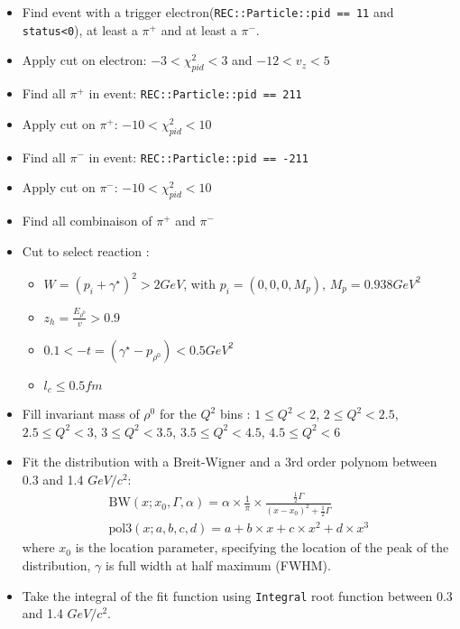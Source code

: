 \documentclass{report}
\begin{document}
    \begin{itemize}
        \item Find event with a trigger electron(\texttt{REC::Particle::pid == 11} and \texttt{status<0}), at least a \(\pi^+\) and at least a \(\pi^-\).
        \item Apply cut on electron: \(-3 < \chi^2_{pid} < 3\) and \(-12 < v_z < 5\)
        \item Find all \(\pi^+\) in event: \texttt{REC::Particle::pid == 211}
        \item Apply cut on \(\pi^+\): \(-10 < \chi^2_{pid} < 10\) 
        \item Find all \(\pi^-\) in event: \texttt{REC::Particle::pid == -211}
        \item Apply cut on \(\pi^-\): \(-10 < \chi^2_{pid} < 10\)
        \item Find all combinaison of \(\pi^+\) and \(\pi^-\)
        \item Cut to select reaction : 
        \begin{itemize}
            \item \(W = (p_i + \gamma^{\star})^2 > 2GeV\), with \(p_i = (0,0,0,M_p)\), \(M_p = 0.938 GeV^2\)
            \item \(z_h = \frac{E_{\rho^0}}{v}> 0.9\)
            \item \( 0.1 < -t = (\gamma^{\star} - p_{\rho^0}) < 0.5 GeV^2\)
            \item \(l_c \le 0.5 fm\)
        \end{itemize}
        \item Fill invariant mass of \(\rho^0\) for the \(Q^2\) bins : \(1 \le Q^2 < 2\), \(2 \le Q^2 < 2.5\), \(2.5 \le Q^2 < 3\), \(3 \le Q^2 < 3.5\), \(3.5 \le Q^2 < 4.5\), \(4.5 \le Q^2 < 6\)
        \item Fit the distribution with a Breit-Wigner and a 3rd order polynom between 0.3 and 1.4 \(GeV/c^2\): 
        \begin{align}
            \text{BW}(x;x_0,\Gamma,\alpha) = \alpha \times \frac{1}{\pi} \times \frac{\frac{1}{2}\Gamma}{(x-x_0)^2 + \frac{1}{2}\Gamma} \\
            \text{pol3}(x;a,b,c,d) = a + b \times x + c \times x^2 + d \times x^3
        \end{align}
        where \(x_{0}\) is the location parameter, specifying the location of the peak of the distribution, \(\gamma\) is full width at half maximum (FWHM).
        \item Take the integral of the fit function using \texttt{Integral} root function between 0.3 and 1.4 \(GeV/c^2\).
    \end{itemize}
\end{document}
